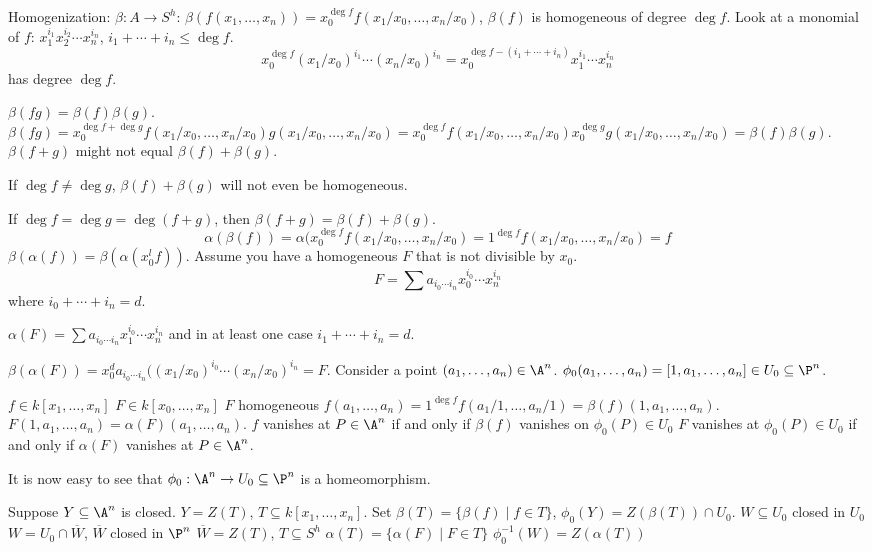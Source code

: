 Homogenization: $\beta: A \to S^h$: $\beta(f(x_1,\ldots,x_n))= x_0^{\deg f} f(x_1/x_0,\ldots,x_n/x_0)$, $\beta(f)$ is homogeneous of degree $\deg f$. Look at a monomial of $f$: $x_1^{i_1} x_2^{i_2} \cdots x_n^{i_n}$, $i_1+\cdots+i_n \leq \deg f$.
	\[
	x_0^{\deg f} (x_1/x_0)^{i_1} \cdots (x_n/x_0)^{i_n}= x_0^{\deg f - (i_1+\cdots+i_n)} x_1^{i_1} \cdots x_n^{i_n}
	\]
has degree $\deg f$.


$\beta(fg)= \beta(f) \beta(g)$.
$\beta(fg)= x_0^{\deg f + \deg g} f(x_1/x_0,\ldots,x_n/x_0) g(x_1/x_0,\ldots,x_n/x_0)= x_0^{\deg f} f(x_1/x_0,\ldots,x_n/x_0) x_0^{\deg g} g(x_1/x_0,\ldots,x_n/x_0)= \beta(f) \beta(g)$. $\beta(f+g)$ might not equal $\beta(f) + \beta(g)$. 

If $\deg f \neq \deg g$, $\beta(f) + \beta(g)$ will not even be homogeneous. 

If $\deg f= \deg g= \deg(f+g)$, then $\beta(f+g)= \beta(f) + \beta(g)$. 
	\[
	\alpha(\beta(f))= \alpha(x_0^{\deg f} f(x_1/x_0,\ldots,x_n/x_0)= 1^{\deg f} f(x_1/x_0,\ldots,x_n/x_0)= f
	\]
$\beta(\alpha(f))= \beta(\alpha(x_0^l f))$. Assume you have a homogeneous $F$ that is not divisible by $x_0$.
	\[
	F= \sum a_{i_0 \cdots i_n} x_0^{i_0} \cdots x_n^{i_n}
	\]
where $i_0 + \cdots + i_n= d$. 


$\alpha(F)= \sum a_{i_0 \cdots i_n} x_1^{i_0} \cdots x_n^{i_n}$ and in at least one case $i_1+ \cdots + i_n = d$. 

$\beta(\alpha(F))= x_0^d a_{i_0 \cdots i_n} ((x_1/x_0)^{i_0} \cdots (x_n/x_0)^{i_n}= F$. Consider a point $(a_1,\ldots,a_n) \in \A^n$. $\phi_0(a_1,\ldots,a_n)= [1,a_1,\ldots,a_n] \in U_0 \subseteq \P^n$. 

$f \in k[x_1,\ldots,x_n]$
$F \in k[x_0,\ldots,x_n]$ $F$ homogeneous
$f(a_1,\ldots,a_n)= 1^{\deg f} f(a_1/1,\ldots,a_n/1)= \beta(f)(1,a_1,\ldots,a_n)$.
$F(1,a_1,\ldots,a_n)= \alpha(F)(a_1,\ldots,a_n)$.
$f$ vanishes at $P \in \A^n$ if and only if $\beta(f)$ vanishes on $\phi_0(P) \in U_0$
$F$ vanishes at $\phi_0(P) \in U_0$ if and only if $\alpha(F)$ vanishes at $P \in \A^n$.

It is now easy to see that $\phi_0: \A^n \to U_0 \subseteq \P^n$ is a homeomorphism. 

Suppose $Y \subseteq \A^n$ is closed. $Y= Z(T)$, $T \subseteq k[x_1,\ldots,x_n]$. Set $\beta(T)= \{ \beta(f) \;|\; f \in T \}$, $\phi_0(Y)= Z(\beta(T)) \cap U_0$. 
$W \subseteq U_0$ closed in $U_0$
$W= U_0 \cap \overline{W}$, $\overline{W}$ closed in $\P^n$
$\overline{W}= Z(T)$, $T \subseteq S^h$
$\alpha(T)= \{ \alpha(F) \;|\; F \in T\}$
$\phi_0^{-1}(W)= Z(\alpha(T))$


